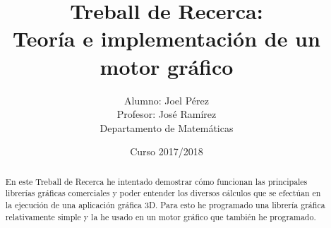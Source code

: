 \documentclass{report}
\title{Treball de Recerca:\\Teoría e implementación de un motor gráfico}
\date{Curso 2017/2018}
\author{Alumno: Joel Pérez\\Profesor: José Ramírez\\Departamento de Matemáticas}
\begin{document}
\lstset{language=C, basicstyle=\ttfamily}

\maketitle


\newpage


\begin{abstract}
  En este Treball de Recerca he intentado demostrar cómo funcionan las principales librerías gráficas comerciales y poder entender los diversos cálculos que se efectúan en la ejecución de una aplicación gráfica 3D. Para esto he programado una librería gráfica relativamente simple y la he usado en un motor gráfico que también he programado.
\end{abstract}

\tableofcontents


























\end{document}
